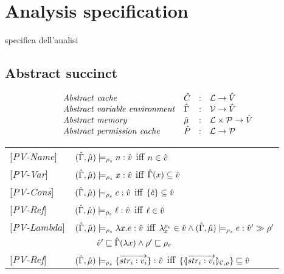 \section{Analysis specification}
\label{sec:AnalysisSpec}
specifica dell'analisi

\subsection{Abstract succinct}
\[
\begin{array}{llcl}
\mathit{Abstract\ cache} & \hat{C} & : & {\mathcal L} \rightarrow \hat{V} \\
\mathit{Abstract\ variable\ environment} & \hat{\Gamma} & : & \mathcal{V} \rightarrow \hat{V} \\
\mathit{Abstract\ memory} & \hat{\mu} & : & {\mathcal L} \times \mathcal{P} \rightarrow \hat{V} \\
\mathit{Abstract\ permission\ cache} & \hat{P} & : & {\mathcal L} \rightarrow \mathcal{P} \\
\end{array}
\]

\begin{tabular}{l l l l}
{[\textit{PV-Name}]}&\multicolumn{3}{l}{$(\hat{\Gamma},\hat{\mu}) \models_{\rho_s} n : \hat{v}$ iff $n \in \hat{v}$} \\
{[\textit{PV-Var}]}&\multicolumn{3}{l}{$(\hat{\Gamma},\hat{\mu}) \models_{\rho_s} x : \hat{v}$ iff $\hat{\Gamma}(x) \subseteq \hat{v}$} \\ 
{[\textit{PV-Cons}]}&\multicolumn{3}{l}{$(\hat{\Gamma},\hat{\mu}) \models_{\rho_s} c : \hat{v}$ iff $\{\hat{c}\} \subseteq \hat{v}$} \\
{[\textit{PV-Ref}]}&\multicolumn{3}{l}{$(\hat{\Gamma},\hat{\mu}) \models_{\rho_s} \ell : \hat{v}$ iff $\ell \in \hat{v}$} \\
{[\textit{PV-Lambda}]}&\multicolumn{3}{l}{$(\hat{\Gamma},\hat{\mu}) \models_{\rho_s} \lambda x.e : \hat{v}$ iff $\lambda_x^{\rho_e} \in \hat{v} \wedge (\hat{\Gamma},\hat{\mu}) \models_{\rho_s} e : \hat{v}'\gg \rho' $} \\
&&\multicolumn{2}{l}{$\hat{v}' \sqsubseteq \hat{\Gamma}(\lambda x) \wedge \rho' \sqsubseteq \rho_e $}\\
{[\textit{PV-Ref}]}&\multicolumn{3}{l}{$(\hat{\Gamma},\hat{\mu}) \models_{\rho_s} \{\overrightarrow{str_i : v_i}\} : \hat{v}$ iff $\{\langle\!| \overrightarrow{str_i: v_i} |\!\rangle_{{\cal C},\rho}\} \sqsubseteq \hat{v}$} \\
\end{tabular}

